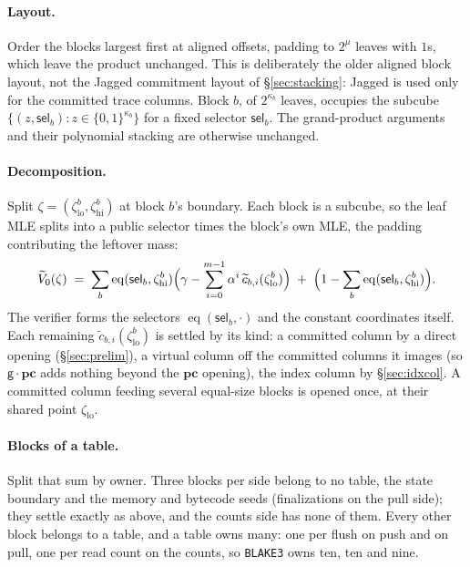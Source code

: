 \documentclass[11pt]{article}
\newcommand{\eq}{\operatorname{eq}}
\newcommand{\cube}[1]{\{0,1\}^{#1}}
\newcommand{\gen}{\mathsf{g}}
\newcommand{\pc}{\mathbf{pc}}
\begin{document}
\paragraph{Layout.} Order the blocks largest first at aligned offsets, padding to $2^{\mu}$ leaves with $1$s, which leave the product unchanged.  This is deliberately the older aligned block layout, not the Jagged commitment layout of \S\ref{sec:stacking}: Jagged is used only for the committed trace columns.  Block $b$, of $2^{\kappa_b}$ leaves, occupies the subcube $\{(z,\mathsf{sel}_b):z\in\cube{\kappa_b}\}$ for a fixed selector $\mathsf{sel}_b$.  The grand-product arguments and their polynomial stacking are otherwise unchanged.

\paragraph{Decomposition.} Split $\zeta=(\zeta^{b}_{\mathrm{lo}},\zeta^{b}_{\mathrm{hi}})$ at block $b$'s boundary. Each block is a subcube, so the leaf MLE splits into a public selector times the block's own MLE, the padding contributing the leftover mass:
\[
  \widetilde V_0(\zeta)\;=\;\sum_b \eq(\mathsf{sel}_b,\zeta^{b}_{\mathrm{hi}})\Bigl(\gamma-\sum_{i=0}^{m-1}\alpha^{i}\,\widetilde c_{b,i}(\zeta^{b}_{\mathrm{lo}})\Bigr)\;+\;\Bigl(1-\sum_b\eq(\mathsf{sel}_b,\zeta^{b}_{\mathrm{hi}})\Bigr).
\]
The verifier forms the selectors $\eq(\mathsf{sel}_b,\cdot)$ and the constant coordinates itself. Each remaining $\widetilde c_{b,i}(\zeta^{b}_{\mathrm{lo}})$ is settled by its kind: a committed column by a direct opening (\S\ref{sec:prelim}), a virtual column off the committed columns it images (so $\gen\cdot\pc$ adds nothing beyond the $\pc$ opening), the index column by \S\ref{sec:idxcol}. A committed column feeding several equal-size blocks is opened once, at their shared point $\zeta_{\mathrm{lo}}$.

\paragraph{Blocks of a table.} Split that sum by owner. Three blocks per side belong to no table, the state boundary and the memory and bytecode seeds (finalizations on the pull side); they settle exactly as above, and the counts side has none of them. Every other block belongs to a table, and a table owns many: one per flush on push and on pull, one per read count on the counts, so \texttt{BLAKE3} owns ten, ten and nine.
\end{document}
